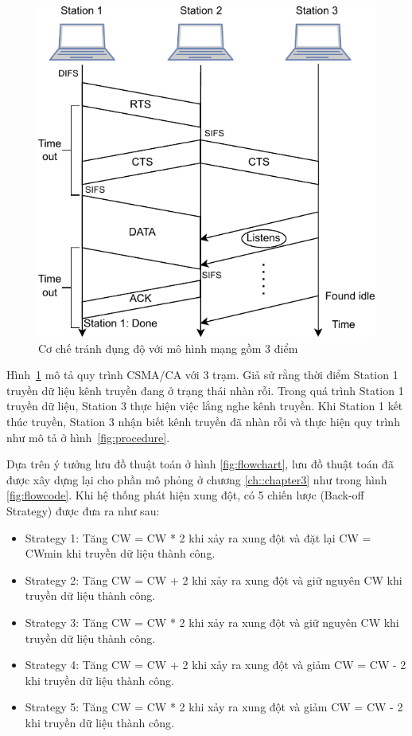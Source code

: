 \begin{figure}[h]
    \centering
    \includegraphics[width=0.6\linewidth]{figures/Chapter2/csma_ca scheme_k2opt.pdf}
    \caption{Cơ chế tránh đụng độ với mô hình mạng gồm 3 điểm}
    \label{fig:csmaca}
\end{figure}

Hình~\ref{fig:csmaca} mô tả quy trình CSMA/CA với 3 trạm. Giả sử rằng thời điểm Station 1 truyền dữ liệu kênh truyền đang ở trạng thái nhàn rỗi.
Trong quá trình Station 1 truyền dữ liệu, Station 3 thực hiện việc lắng nghe kênh truyền. Khi Station 1 kết thúc truyền, Station 3 nhận biết kênh truyền 
đã nhàn rỗi và thực hiện quy trình như mô tả ở hình~\ref{fig:procedure}.



Dựa trên ý tưởng lưu đồ thuật toán ở hình \ref{fig:flowchart}, lưu đồ thuật toán đã được xây dựng lại cho phần mô phỏng ở chương \ref{ch::chapter3} như trong hình \ref{fig:flowcode}. Khi hệ thống phát hiện
xung đột, có 5 chiến lược (Back-off Strategy) được đưa ra như sau:
\begin{itemize}
    \item Strategy 1: Tăng CW = CW * 2 khi xảy ra xung đột và đặt lại CW = CWmin khi truyền dữ liệu thành công.
    \item Strategy 2: Tăng CW = CW + 2 khi xảy ra xung đột và giữ nguyên CW khi truyền dữ liệu thành công.
    \item Strategy 3: Tăng CW = CW * 2 khi xảy ra xung đột và giữ nguyên CW khi truyền dữ liệu thành công.
    \item Strategy 4: Tăng CW = CW + 2 khi xảy ra xung đột và giảm CW = CW - 2 khi truyền dữ liệu thành công.
    \item Strategy 5: Tăng CW = CW * 2 khi xảy ra xung đột và giảm CW = CW - 2 khi truyền dữ liệu thành công.
\end{itemize}


